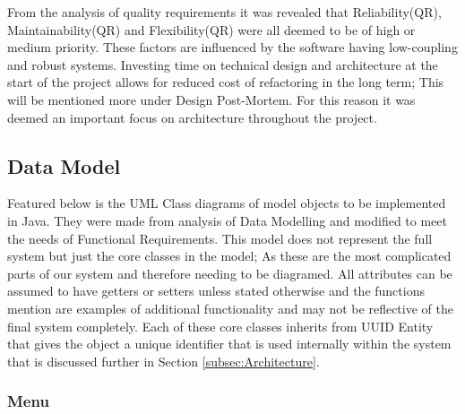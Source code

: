From the analysis of quality requirements it was revealed that Reliability(QR), Maintainability(QR) and Flexibility(QR) were all deemed to be of high or medium priority. These factors are influenced by the software having low-coupling and robust systems. Investing time on technical design and architecture at the start of the project allows for reduced cost of refactoring in the long term; This will be mentioned more under Design Post-Mortem. For this reason it was deemed an important focus on architecture throughout the project.

\subsection{Data Model} \label{subsec:DataModel}
Featured below is the UML Class diagrams of model objects to be implemented in Java. They were made from analysis of Data Modelling and modified to meet the needs of Functional Requirements. This model does not represent the full system but just the core classes in the model; As these are the most complicated parts of our system and therefore needing to be diagramed. All attributes can be assumed to have getters or setters unless stated otherwise and the functions mention are examples of additional functionality and may not be reflective of the final system completely.
Each of these core classes inherits from UUID Entity that gives the object a unique identifier that is used internally within the system that is discussed further in Section \ref{subsec:Architecture}.

\subsubsection{Menu}

